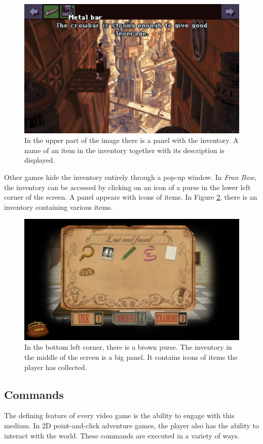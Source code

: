 \begin{figure}[H]
\centering
\includegraphics[width=.8\linewidth]{img/I-BaSS2.png}
\caption{In the upper part of the image there is a panel with the inventory. A name of an item in the inventory together with its description is displayed.}
\label{fig:I-BaSS2}
\end{figure}

Other games hide the inventory entirely through a pop-up window. In \textit{Fran Bow}, the inventory can be accessed by clicking on an icon of a purse in the lower left corner of the screen. A panel appears with icons of items. In Figure \ref{fig:I-FranBow}, there is an inventory containing various items.
\begin{figure}[H]
\centering
\includegraphics[width=.8\linewidth]{img/I-FB.png}
\caption{In the bottom left corner, there is a brown purse. The inventory in the middle of the screen is a big panel. It contains icons of items the player has collected.}
\label{fig:I-FranBow}
\end{figure}
 
\subsection{Commands}
\label{sec:Commands}
The defining feature of every video game is the ability to engage with this medium. In 2D point-and-click adventure games, the player also has the ability to interact with the world. These commands are executed in a variety of ways.

